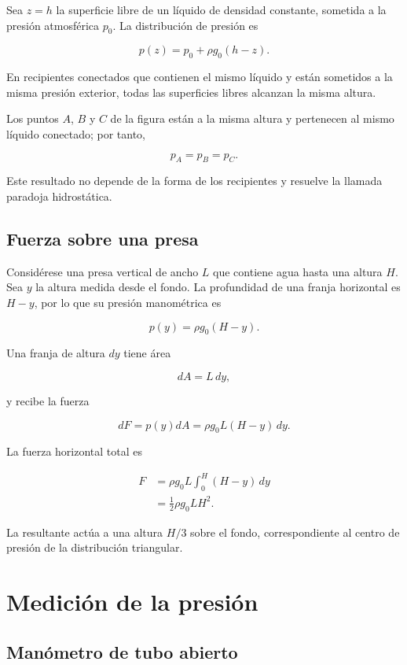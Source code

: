 Sea $z=h$ la superficie libre de un líquido de densidad constante, sometida a
la presión atmosférica $p_0$. La distribución de presión es

$$
\boxed{
p(z)=p_0+\rho g_0(h-z)
}.
$$

En recipientes conectados que contienen el mismo líquido y están sometidos a
la misma presión exterior, todas las superficies libres alcanzan la misma
altura.

\figuraVasosComunicantes

Los puntos $A$, $B$ y $C$ de la figura están a la misma altura y pertenecen al
mismo líquido conectado; por tanto,

$$
\boxed{
p_A=p_B=p_C
}.
$$

Este resultado no depende de la forma de los recipientes y resuelve la llamada
paradoja hidrostática.

\subsection{Fuerza sobre una presa}

Considérese una presa vertical de ancho $L$ que contiene agua hasta una altura
$H$. Sea $y$ la altura medida desde el fondo. La profundidad de una franja
horizontal es $H-y$, por lo que su presión manométrica es

$$
p(y)=\rho g_0(H-y).
$$

Una franja de altura $dy$ tiene área

$$
dA=L\,dy,
$$

y recibe la fuerza

$$
dF=p(y)dA
=\rho g_0L(H-y)\,dy.
$$

\figuraFuerzaPresa

La fuerza horizontal total es

$$
\begin{aligned}
F
&=\rho g_0L\int_0^H(H-y)\,dy\\
&=\boxed{\frac{1}{2}\rho g_0LH^2}.
\end{aligned}
$$

La resultante actúa a una altura $H/3$ sobre el fondo, correspondiente al
centro de presión de la distribución triangular.

\section{Medición de la presión}

\subsection{Manómetro de tubo abierto}

